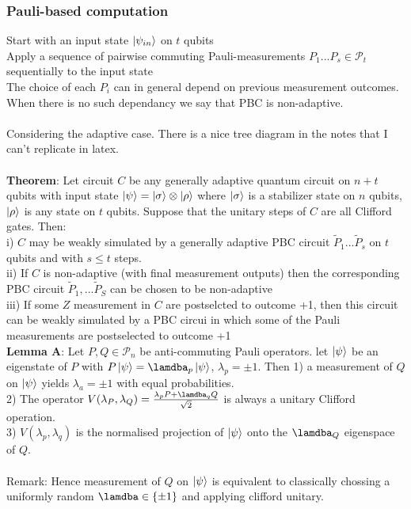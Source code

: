 \documentclass{article}
\begin{document}
\subsubsection{Pauli-based computation}
Start with an input state $\ket{\psi_{in}}$ on $t$ qubits\\
Apply a sequence of pairwise commuting Pauli-measurements $P_1...P_s \in \mathcal{P}_t$ sequentially to the input state\\
The choice of each $P_i$ can in general depend on previous measurement outcomes. When there is no such dependancy we say that PBC is non-adaptive.\\\\
Considering the adaptive case. There is a nice tree diagram in the notes that I can't replicate in latex. \\\\
\textbf{Theorem}: Let circuit $C$ be any generally adaptive quantum circuit on $n+t$ qubits with input state $\ket{\psi} = \ket{\sigma } \otimes \ket{\rho}$ where $\ket{\sigma}$ is a stabilizer state on $n$ qubits, $\ket{\rho}$ is any state on $t$ qubits. Suppose that the unitary steps of $C$ are all Clifford gates. Then:\\
i) $C$ may be weakly simulated by a generally adaptive PBC circuit $\tilde P_1 ... \tilde P_s$ on $t$ qubits and with $s \leq t$ steps.\\
ii) If $C$ is non-adaptive (with final measurement outputs) then the corresponding PBC circuit $\tilde P_1, ... \tilde P_S$ can be chosen to be non-adaptive \\
iii) If some $Z$ measurement in $C$ are postselcted to outcome +1, then this circuit can be weakly simulated by a PBC circui in which some of the Pauli measurements are postselected to outcome +1\\
\textbf{Lemma A}: Let $P, Q \in \mathcal{P}_n$ be anti-commuting Pauli operators. let $\ket{\psi}$ be an eigenstate of $P$ with $P\ket{\psi} = \lamdba_p \ket{\psi}$, $\lambda_p = \pm 1$. Then 1) a measurement of $Q$ on $\ket{\psi}$ yields $\lambda_a = \pm 1$ with equal probabilities.\\
2) The operator $V( \lambda_P, \lambda_Q) = \frac{\lambda_p P + \lamdba_q Q}{\sqrt{2}}$ is always a unitary Clifford operation.\\
3) $V(\lambda_p, \lambda_q)$ is the normalised projection of $\ket{\psi}$ onto the $\lamdba_Q$ eigenspace of $Q$.\\\\
Remark: Hence measurement of $Q$ on $\ket{\psi}$ is equivalent to classically chossing a uniformly random $\lamdba \in \{ \pm 1\}$ and applying clifford unitary.
\end{document}
